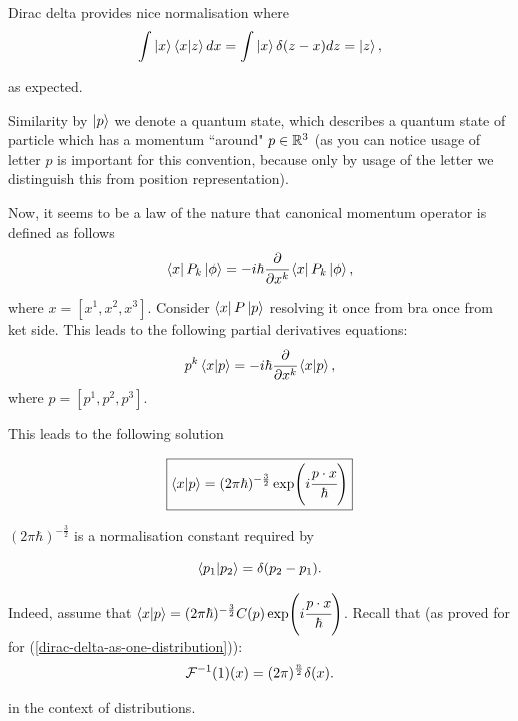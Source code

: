 \documentclass[main.tex]{subfiles}
\begin{document}
Dirac delta provides nice normalisation where
\begin{equation}
\int \ket{x}\bra{x}\ket{z}dx = \int \ket{x}\delta(z - x) dz = \ket{z},  
\end{equation}    

as expected.

Similarity by $\ket{p}$ we denote a quantum state, which describes a quantum state of particle which has a momentum ``around" $p\in \mathbb{R}^3$ (as you can notice usage of letter $p$ is important for this convention, because only by usage of the letter we distinguish this from position representation).

Now, it seems to be a law of the nature that canonical momentum operator is defined as follows
\begin{equation}
\bra{x}P_k\ket{\phi} = -i\hbar \cfrac{\partial}{\partial x^k} \bra{x}P_k\ket{\phi},
\end{equation}

where $x=[x^1, x^2, x^3]$. Consider $\bra{x}P\ket{p}$ resolving it once from bra once from ket side. This leads to the following partial derivatives equations:
\begin{equation}
p^k \bra{x}\ket{p} = -i\hbar \cfrac{\partial}{\partial x^k} \bra{x} \ket{p},
\end{equation}
where $p = [p^1, p^2, p^3]$.

This leads to the following solution

\begin{equation}
\boxed{
\bra{x}\ket{p} = (2\pi\hbar)^{-\frac{3}{2}} \exp(i\cfrac{p\cdot x}{\hbar})
}
\end{equation}

$(2\pi\hbar)^{-\frac{3}{2}}$ is a normalisation constant required by

\begin{equation}
\bra{p_1}\ket{p_2} = \delta(p_2 - p_1).
\end{equation} 

Indeed, assume that 
$\bra{x}\ket{p} = (2\pi\hbar)^{-\frac{3}{2}}C(p) \exp(i\cfrac{p\cdot x}{\hbar})$.
Recall that (as proved for for (\ref{dirac-delta-as-one-distribution})):
\begin{equation}
\mathcal{F}^{-1}(1)(x) = (2\pi)^\frac{n}{2}\delta(x). 
\end{equation}

in the context of distributions.
\end{document}
